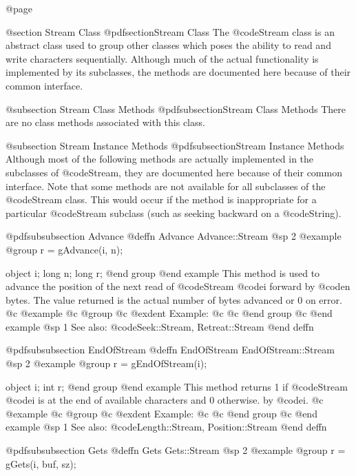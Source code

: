 @page

@section Stream Class
@pdfsection{Stream Class}
The @code{Stream} class is an abstract class used to group other classes
which poses the ability to read and write characters sequentially.
Although much of the actual functionality is implemented by its
subclasses, the methods are documented here because of their common
interface.

@subsection Stream Class Methods
@pdfsubsection{Stream Class Methods}
There are no class methods associated with this class.


@subsection Stream Instance Methods
@pdfsubsection{Stream Instance Methods}
Although most of the following methods are actually implemented in the
subclasses of @code{Stream}, they are documented here because of their
common interface.  Note that some methods are not available for all
subclasses of the @code{Stream} class.  This would occur if the method
is inappropriate for a particular @code{Stream} subclass (such as
seeking backward on a @code{String}).





@pdfsubsubsection {Advance}
@deffn {Advance} Advance::Stream
@sp 2
@example
@group
r = gAdvance(i, n);

object  i;
long    n;
long    r;
@end group
@end example
This method is used to advance the position of the next
read of @code{Stream} @code{i} forward by @code{n} bytes.
The value returned is the actual number of bytes advanced or
0 on error.
@c @example
@c @group
@c @exdent Example:
@c  
@c @end group
@c @end example
@sp 1
See also:  @code{Seek::Stream, Retreat::Stream}
@end deffn








@pdfsubsubsection {EndOfStream}
@deffn {EndOfStream} EndOfStream::Stream
@sp 2
@example
@group
r = gEndOfStream(i);

object  i;
int     r;
@end group
@end example
This method returns 1 if @code{Stream} @code{i} is at the end of available
characters and 0 otherwise.
by @code{i}.
@c @example
@c @group
@c @exdent Example:
@c  
@c @end group
@c @end example
@sp 1
See also:  @code{Length::Stream, Position::Stream}
@end deffn








@pdfsubsubsection {Gets}
@deffn {Gets} Gets::Stream
@sp 2
@example
@group
r = gGets(i, buf, sz);

